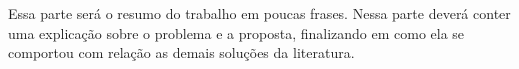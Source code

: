 Essa parte será o resumo do trabalho em poucas frases. Nessa parte deverá conter uma explicação sobre o problema e a proposta, finalizando em como ela se comportou com relação as demais soluções da literatura.